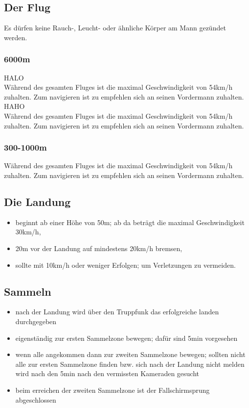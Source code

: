 \subsection{Der Flug}
Es dürfen keine Rauch-, Leucht- oder ähnliche Körper am Mann gezündet werden.
\subsubsection{6000m}
	HALO \\
	Während des gesamten Fluges ist die maximal Geschwindigkeit von 54km/h zuhalten. Zum navigieren ist zu empfehlen sich an seinen Vordermann zuhalten. \\
	HAHO \\
	Während des gesamten Fluges ist die maximal Geschwindigkeit von 54km/h zuhalten. Zum navigieren ist zu empfehlen sich an seinen Vordermann zuhalten.

\subsubsection{300-1000m}
	Während des gesamten Fluges ist die maximal Geschwindigkeit von 54km/h zuhalten. Zum navigieren ist zu empfehlen sich an seinen Vordermann zuhalten.

\subsection{Die Landung}
	\begin{itemize}
		\item beginnt ab einer Höhe von 50m; ab da beträgt die maximal Geschwindigkeit 30km/h,
		\item 20m vor der Landung auf mindestens 20km/h bremsen,
		\item sollte mit 10km/h oder weniger Erfolgen; um Verletzungen zu vermeiden.
	\end{itemize}

\subsection{Sammeln}
	\begin{itemize}
		\item nach der Landung wird über den Truppfunk das erfolgreiche landen durchgegeben
		\item eigenständig zur ersten Sammelzone bewegen; dafür sind 5min vorgesehen
		\item wenn alle angekommen dann zur zweiten Sammelzone bewegen; sollten nicht alle zur ersten Sammelzone finden bzw. sich nach der Landung nicht melden wird nach den 5min nach den vermissten Kameraden gesucht
		\item beim erreichen der zweiten Sammelzone ist der Fallschirmsprung abgeschlossen
	\end{itemize}